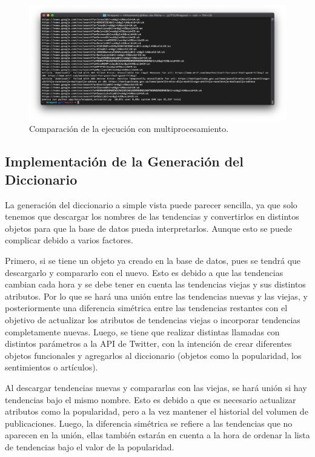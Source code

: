 \begin{figure}[H]
    \centering
    \myfloatalign
    \includegraphics[width=1\textwidth]{gfx/comparacion-multiprocesamiento2.png}
    \caption[Comparación de la ejecución con multiprocesamiento]{Comparación de la ejecución con multiprocesamiento.}\label{gfx:comparacion-multiprocesamiento2}
\end{figure}

\subsection{Implementación de la Generación del Diccionario}
La generación del diccionario a simple vista puede parecer sencilla, ya que solo tenemos que descargar los nombres de las tendencias y convertirlos en distintos objetos para que la base de datos pueda interpretarlos. Aunque esto se puede complicar debido a varios factores.

\vspace{0.3cm}

Primero, si se tiene un objeto ya creado en la base de datos, pues se tendrá que descargarlo y compararlo con el nuevo. Esto es debido a que las tendencias cambian cada hora y se debe tener en cuenta las tendencias viejas y sus distintos atributos. Por lo que se hará una unión entre las tendencias nuevas y las viejas, y posteriormente una diferencia simétrica entre las tendencias restantes con el objetivo de actualizar los atributos de tendencias viejas o incorporar tendencias completamente nuevas. Luego, se tiene que realizar distintas llamadas con distintos parámetros a la API de Twitter, con la intención de crear diferentes objetos funcionales y agregarlos al diccionario (objetos como la popularidad, los sentimientos o artículos).

\vspace{0.3cm}

Al descargar tendencias nuevas y compararlas con las viejas, se hará unión si hay tendencias bajo el mismo nombre. Esto es debido a que es necesario actualizar atributos como la popularidad, pero a la vez mantener el historial del volumen de publicaciones. Luego, la diferencia simétrica se refiere a las tendencias que no aparecen en la unión, ellas también estarán en cuenta a la hora de ordenar la lista de tendencias bajo el valor de la popularidad.


